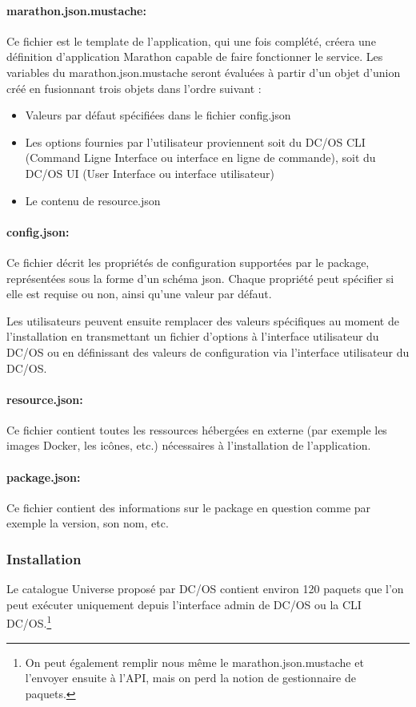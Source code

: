 \documentclass[11pt,fleqn]{book} %
\begin{document}
\paragraph{marathon.json.mustache:} Ce fichier est le template de l'application, qui une fois complété, créera une définition d'application Marathon capable de faire fonctionner le service. Les variables du marathon.json.mustache seront évaluées à partir d'un objet d'union créé en fusionnant trois objets dans l'ordre suivant :
\begin{itemize}
    \item Valeurs par défaut spécifiées dans le fichier config.json
    \item Les options fournies par l'utilisateur proviennent soit du DC/OS CLI (Command Ligne Interface ou interface en ligne de commande), soit du DC/OS UI (User Interface ou interface utilisateur)
    \item Le contenu de resource.json
\end{itemize}


\paragraph{config.json:} Ce fichier décrit les propriétés de configuration supportées par le package, représentées sous la forme d'un schéma json. Chaque propriété peut spécifier si elle est requise ou non, ainsi qu'une valeur par défaut.

Les utilisateurs peuvent ensuite remplacer des valeurs spécifiques au moment de l'installation en transmettant un fichier d'options à l'interface utilisateur du DC/OS ou en définissant des valeurs de configuration via l'interface utilisateur du DC/OS.

\paragraph{resource.json:} Ce fichier contient toutes les ressources hébergées en externe (par exemple les images Docker, les icônes, etc.) nécessaires à l'installation de l'application.

\paragraph{package.json:} Ce fichier contient des informations sur le package en question comme par exemple la version, son nom, etc.\newline 

\subsubsection{Installation}
Le catalogue Universe proposé par DC/OS contient environ 120 paquets que l'on peut exécuter uniquement depuis l'interface admin de DC/OS ou la CLI DC/OS.\footnote{On peut également remplir nous même le marathon.json.mustache et l'envoyer ensuite à l'API, mais on perd la notion de gestionnaire de paquets.}
\end{document}
